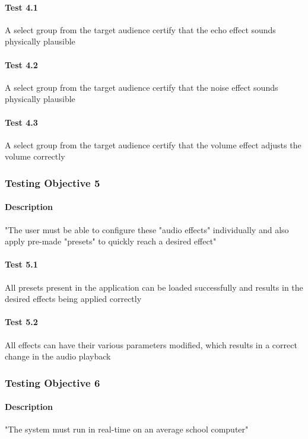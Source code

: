 \paragraph{Test 4.1} A select group from the target audience certify that the echo effect sounds physically plausible
\paragraph{Test 4.2} A select group from the target audience certify  that the noise effect sounds physically plausible
\paragraph{Test 4.3} A select group from the target audience certify that the volume effect adjusts the volume correctly

\pagebreak
\subsubsection{Testing Objective 5}
\paragraph{Description} "The user must be able to configure these "audio effects" individually and also apply pre-made "presets" to quickly reach a desired effect"

\paragraph{Test 5.1} All presets present in the application can be loaded successfully and results in the desired effects being applied correctly
\paragraph{Test 5.2} All effects can have their various parameters modified, which results in a correct change in the audio playback

\pagebreak
\subsubsection{Testing Objective 6}
\paragraph{Description}  "The system must run in real-time on an average school computer"

